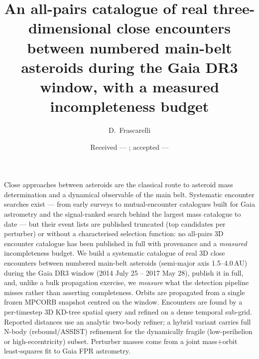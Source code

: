 \documentclass{aa}
\begin{document}
\title{An all-pairs catalogue of real three-dimensional close encounters
between numbered main-belt asteroids during the Gaia DR3 window, with a
measured incompleteness budget}


\author{D.~Frascarelli}


\date{Received --- ; accepted ---}

\abstract
{Close approaches between asteroids are the classical route to asteroid mass
determination and a dynamical observable of the main belt. Systematic encounter
searches exist --- from early surveys \citep{galad2002} to mutual-encounter
catalogues built for Gaia astrometry \citep{ivantsov2018} and the
signal-ranked search behind the largest mass catalogue to date
\citep{fuentesmunoz2025} --- but their event lists are published truncated
(top candidates per perturber) or without a characterised selection function:
no all-pairs 3D encounter catalogue has been published in full with provenance
and a \emph{measured} incompleteness budget.}
{We build a systematic catalogue of real 3D close encounters between numbered
main-belt asteroids (semi-major axis 1.5--4.0\,AU) during the Gaia DR3 window
(2014 July 25 -- 2017 May 28), publish it in full, and, unlike a
bulk propagation exercise, we \emph{measure} what the detection pipeline misses
rather than asserting completeness.}
{Orbits are propagated from a single frozen MPCORB snapshot centred on the
window. Encounters are found by a per-timestep 3D KD-tree spatial query and
refined on a dense temporal sub-grid. Reported distances use an analytic
two-body refiner; a hybrid variant carries full N-body (rebound/ASSIST)
refinement for the dynamically fragile (low-perihelion or high-eccentricity)
subset. Perturber masses come from a joint mass$+$orbit least-squares fit to
Gaia FPR astrometry.}
\end{document}
